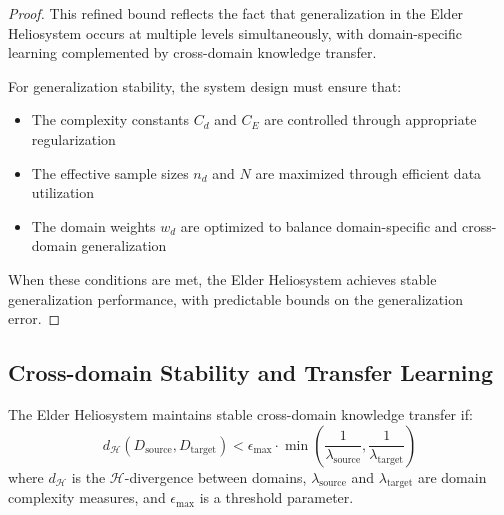 \begin{proof}
This refined bound reflects the fact that generalization in the Elder Heliosystem occurs at multiple levels simultaneously, with domain-specific learning complemented by cross-domain knowledge transfer.

For generalization stability, the system design must ensure that:
\begin{itemize}
    \item The complexity constants $C_d$ and $C_E$ are controlled through appropriate regularization
    \item The effective sample sizes $n_d$ and $N$ are maximized through efficient data utilization
    \item The domain weights $w_d$ are optimized to balance domain-specific and cross-domain generalization
\end{itemize}

When these conditions are met, the Elder Heliosystem achieves stable generalization performance, with predictable bounds on the generalization error.
\end{proof}

\subsection{Cross-domain Stability and Transfer Learning}

\begin{theorem}
The Elder Heliosystem maintains stable cross-domain knowledge transfer if:
\begin{equation}
d_{\mathcal{H}}(D_{\text{source}}, D_{\text{target}}) < \epsilon_{\text{max}} \cdot \min\left(\frac{1}{\lambda_{\text{source}}}, \frac{1}{\lambda_{\text{target}}}\right)
\end{equation}
where $d_{\mathcal{H}}$ is the $\mathcal{H}$-divergence between domains, $\lambda_{\text{source}}$ and $\lambda_{\text{target}}$ are domain complexity measures, and $\epsilon_{\text{max}}$ is a threshold parameter.
\end{theorem}

